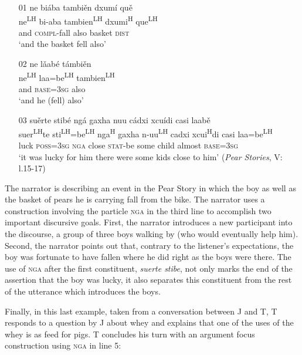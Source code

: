 \ea\label{nga}
\begin{itemize}
\item[01]
\glll ne bi\'{a}ba tambi\v{e}n dxum\'{i} qu\v{e} \\
ne\textsuperscript{LH} bi-aba tambien\textsuperscript{LH} dxumi\textsuperscript{H} que\textsuperscript{LH} \\
and \textsc{compl}-fall also basket \textsc{dist} \\
\glt `and the basket fell also'


\item[02]
\glll ne l\v{a}ab\'{e} t\'{a}mbi\v{e}n \\
ne\textsuperscript{LH} laa=be\textsuperscript{LH} tambien\textsuperscript{LH} \\
and \textsc{base}=3\textsc{sg} also \\
\glt `and he (fell) also' 


\item[03]
\glll su\v{e}rte stib\'{e} ng\'{a} gaxha nuu c\'{a}dxi xcu\'{i}di casi laab\v{e}  \\
suer\textsuperscript{LH}te sti\textsuperscript{LH}=be\textsuperscript{LH} nga\textsuperscript{H} gaxha n-uu\textsuperscript{LH} cadxi xcui\textsuperscript{H}di casi laa=be\textsuperscript{LH}  \\
luck \textsc{poss}=3\textsc{sg} \textsc{nga} close \textsc{stat}-be some child almost \textsc{base}=3\textsc{sg}  \\
\glt `it was lucky for him there were some kids close to him' \hfill (\textit{Pear Stories}, V: l.15-17)

\end{itemize}
\z
The narrator is describing an event in the Pear Story in which the boy as well as the basket of pears he is carrying fall from the bike. The narrator uses a construction involving the particle \textsc{nga} in the third line to accomplish two important discursive goals. First, the narrator introduces a new participant into the discourse, a group of three boys walking by (who would eventually help him). Second, the narrator points out that, contrary to the listener's expectations, the boy was fortunate to have fallen where he did right as the boys were there. The use of \textsc{nga} after the first constituent, \textit{suerte stibe}, not only marks the end of the assertion that the boy was lucky, it also separates this constituent from the rest of the utterance which introduces the boys. 

Finally, in this last example, taken from a conversation between J and T, T responds to a question by J about whey and explains that one of the uses of the whey is as feed for pigs. T concludes his turn with an argument focus construction using \textsc{nga} in line 5:

